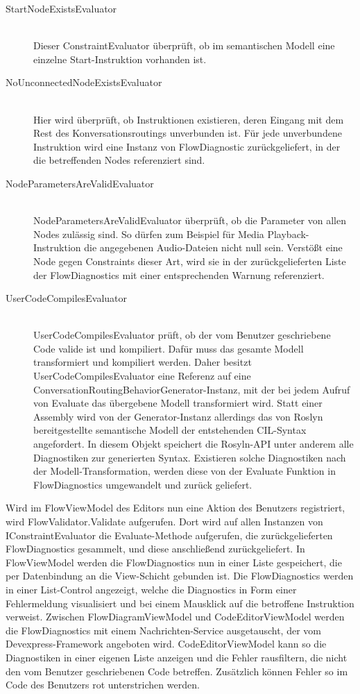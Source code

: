 \begin{description}
\item[StartNodeExistsEvaluator] \hfill \\
Dieser ConstraintEvaluator überprüft, ob im semantischen Modell eine einzelne Start-Instruktion vorhanden ist.
\item[NoUnconnectedNodeExistsEvaluator] \hfill \\
Hier wird überprüft, ob Instruktionen existieren, deren Eingang mit dem Rest des Konversationsroutings unverbunden ist. Für jede unverbundene Instruktion wird eine Instanz von FlowDiagnostic zurückgeliefert, in der die betreffenden Nodes referenziert sind.
\item[NodeParametersAreValidEvaluator] \hfill \\
NodeParametersAreValidEvaluator überprüft, ob die Parameter von allen Nodes zulässig sind. So dürfen zum Beispiel für Media Playback-Instruktion die angegebenen Audio-Dateien nicht null sein. Verstößt eine Node gegen Constraints dieser Art, wird sie in der zurückgelieferten Liste der FlowDiagnostics mit einer entsprechenden Warnung referenziert.
\item[UserCodeCompilesEvaluator] \hfill \\
UserCodeCompilesEvaluator prüft, ob der vom Benutzer geschriebene Code valide ist und kompiliert. Dafür muss das gesamte Modell transformiert und kompiliert werden. Daher besitzt UserCodeCompilesEvaluator eine Referenz auf eine ConversationRoutingBehaviorGenerator-Instanz, mit der bei jedem Aufruf von Evaluate das übergebene Modell transformiert wird. Statt einer Assembly wird von der Generator-Instanz allerdings das von Roslyn bereitgestellte semantische Modell der entstehenden CIL-Syntax angefordert. In diesem Objekt speichert die Rosyln-API unter anderem alle Diagnostiken zur generierten Syntax. Existieren solche Diagnostiken nach der Modell-Transformation, werden diese von der Evaluate Funktion in FlowDiagnostics umgewandelt und zurück geliefert.
\end{description}
Wird im FlowViewModel des Editors nun eine Aktion des Benutzers registriert, wird FlowValidator.Validate aufgerufen. Dort wird auf allen Instanzen von IConstraintEvaluator die Evaluate-Methode aufgerufen, die zurückgelieferten FlowDiagnostics gesammelt, und diese anschließend zurückgeliefert. In FlowViewModel werden die FlowDiagnostics nun in einer Liste gespeichert, die per Datenbindung an die View-Schicht gebunden ist. Die FlowDiagnostics werden in einer List-Control angezeigt, welche die Diagnostics in Form einer Fehlermeldung visualisiert und bei einem Mausklick auf die betroffene Instruktion verweist. Zwischen FlowDiagramViewModel und CodeEditorViewModel werden die FlowDiagnostics mit einem Nachrichten-Service ausgetauscht, der vom Devexpress-Framework angeboten wird. CodeEditorViewModel kann so die Diagnostiken in einer eigenen Liste anzeigen und die Fehler rausfiltern, die nicht den vom Benutzer geschriebenen Code betreffen. Zusätzlich können Fehler so im Code des Benutzers rot unterstrichen werden.

